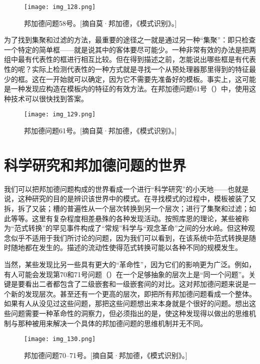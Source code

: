 \begin{figure}
\texttt{[image: img\_128.png]}
\caption[邦加德问题58号。]
  {邦加德问题58号。[摘自莫·邦加德，《模式识别》。] }
\end{figure}

为了找到集聚和过滤的方法，最重要的途径之一就是通过另一种“集聚”：即只检查一个特定的简单框——就是说其中的客体要尽可能少。一种非常有效的办法是把两组中最有代表性的框进行相互比较。但在得到描述之前，怎能说出哪些框是有代表性的呢？实际上检测代表性的一种方式就是寻找一个从预处理器那里得到的特征最少的框。这在一开始就可以确定，因为它不需要先准备好的模板。事实上，这可能是一种发现应构造在模板内的特征的有效方法。在邦加德问题61号（）中，使用这种技术可以很快找到答案。

\begin{figure}
\texttt{[image: img\_129.png]}
\caption[邦加德问题61号。]
  {邦加德问题61号。[摘自莫·邦加德，《模式识别》。] }
\end{figure}

\section{科学研究和邦加德问题的世界}

我们可以把邦加德问题构成的世界看成一个进行“科学研究”的小天地——也就是说，这种研究的目的是辨识该世界中的模式。在寻找模式的过程中，模板被装了又拆，拆了又装；槽的普遍性从一个层次转换到另一个层次；进行了集聚和过滤；如此等等。这里有复杂程度相差悬殊的各种发现活动。按照库恩的理论，某些被称为“范式转换”的罕见事件构成了“常规”科学与“观念革命”之间的分水岭。但这种观念似乎不适用于我们所讨论的问题，因为我们可以看到，在该系统中范式转换是随时随地都在发生的。描述的流动性使得范式转换可能以各种不同的规模发生。

当然，某些发现比另一些具有更大的“革命性”，因为它们的影响更为广泛。例如，有人可能会发现第70和71号问题（）在一个足够抽象的层次上是“同一个问题”。关键是要看出二者都包含了二级嵌套和一级嵌套间的对比。这对邦加德问题来说是一个新的发现层次。甚至还有一个更高的层次，即把所有邦加德问题看成一个整体。如果有人从没见过这些问题，那把这些问题想出来本身就是个很好的问题。想出这些问题需要一种革命性的洞察力，但必须指出的是，使这种发现得以做出的思维机制与那种被用来解决一个具体的邦加德问题的思维机制并无不同。

\begin{figure}
\texttt{[image: img\_130.png]}
\caption[邦加德问题70--71号。]
  {邦加德问题70--71号。[摘自莫·邦加德，《模式识别》。] }
\end{figure}

